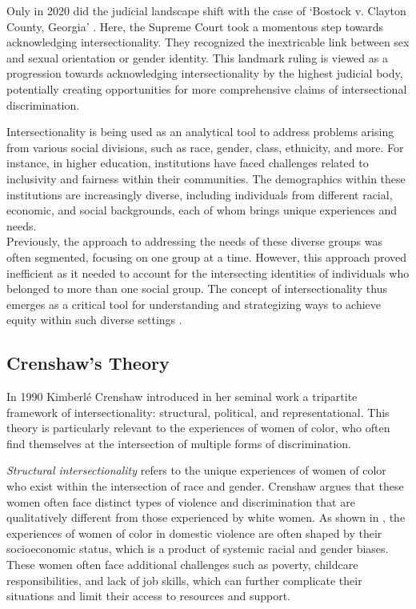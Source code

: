 Only in 2020 did the judicial landscape shift with the case of `Bostock v. Clayton County, Georgia' \cite{lund2020unleashed}. Here, the Supreme Court took a momentous step towards acknowledging intersectionality. They recognized the inextricable link between sex and sexual orientation or gender identity. This landmark ruling is viewed as a progression towards acknowledging intersectionality by the highest judicial body, potentially creating opportunities for more comprehensive claims of intersectional discrimination.

Intersectionality is being used as an analytical tool to address problems arising from various social divisions, such as race, gender, class, ethnicity, and more. For instance, in higher education, institutions have faced challenges related to inclusivity and fairness within their communities. The demographics within these institutions are increasingly diverse, including individuals from different racial, economic, and social backgrounds, each of whom brings unique experiences and needs.\\
Previously, the approach to addressing the needs of these diverse groups was often segmented, focusing on one group at a time. However, this approach proved inefficient as it needed to account for the intersecting identities of individuals who belonged to more than one social group. The concept of intersectionality thus emerges as a critical tool for understanding and strategizing ways to achieve equity within such diverse settings \cite{collins2020intersectionality}.

\subsection{Crenshaw's Theory} 
\label{sec:int_crensh}
In 1990 Kimberlé Crenshaw introduced in her seminal work \cite{crenshaw1990mapping} a tripartite framework of intersectionality: structural, political, and representational. This theory is particularly relevant to the experiences of women of color, who often find themselves at the intersection of multiple forms of discrimination.



\emph{Structural intersectionality} refers to the unique experiences of women of color who exist within the intersection of race and gender. Crenshaw argues that these women often face distinct types of violence and discrimination that are qualitatively different from those experienced by white women. As shown in \cite{crenshaw1990mapping}, the experiences of women of color in domestic violence are often shaped by their socioeconomic status, which is a product of systemic racial and gender biases. These women often face additional challenges such as poverty, childcare responsibilities, and lack of job skills, which can further complicate their situations and limit their access to resources and support.

